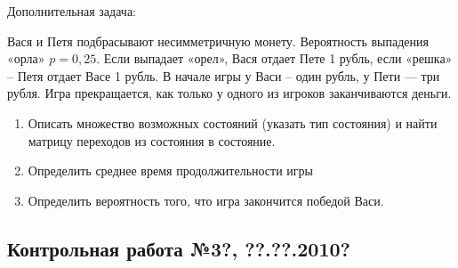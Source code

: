 \documentclass[12pt, a4paper]{article}\usepackage[]{graphicx}\usepackage[]{color}
\begin{document}
Дополнительная задача:

Вася и Петя подбрасывают несимметричную монету. Вероятность выпадения «орла» $p=0,25$. Если выпадает «орел», Вася отдает Пете 1 рубль, если «решка» -- Петя отдает Васе 1 рубль. В начале игры у Васи -- один рубль, у Пети — три рубля. Игра прекращается, как только у одного из игроков заканчиваются деньги.
\begin{enumerate}
\item Описать множество возможных состояний (указать тип состояния) и найти матрицу переходов из состояния в состояние.
\item Определить среднее время продолжительности игры
\item Определить вероятность того, что игра закончится победой Васи.
\end{enumerate}

\subsection{Контрольная работа №3?, ??.??.2010?}
\end{document}
